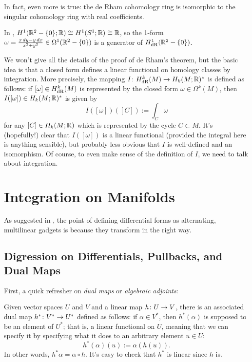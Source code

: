 In fact, even more is true: the de Rham cohomology ring is isomorphic to the singular cohomology ring with real coefficients.

In , $H^1(\mathbb{R}^2 -\{0\};\mathbb{R}) \cong H^1(S^1;\mathbb{R}) \cong \mathbb{R}$, so the 1-form $\omega = \frac{x\, dy - y\, dx}{x^2 + y^2} \in \Omega^1(\mathbb{R}^2 -\{0\})$ is a generator of $H_{\text{dR}}^1(\mathbb{R}^2-\{0\})$.

We won't give all the details of the proof of de Rham's theorem, but the basic idea is that a closed form defines a linear functional on homology classes by integration. More precisely, the mapping $I \colon\thinspace\! H_{\text{dR}}^k(M) \to H_k(M;\mathbb{R})^\ast$ is defined as follows: if $[\omega] \in H_{\text{dR}}^k(M)$ is represented by the closed form $\omega \in \Omega^k(M)$, then $I([\omega]) \in H_k(M;\mathbb{R})^\ast$ is given by
\[
	I([\omega])([C]) := \int_C \omega
\]
for any $[C] \in H_k(M;\mathbb{R})$ which is represented by the cycle $C \subset M$. It's (hopefully!) clear that $I([\omega])$ is a linear functional (provided the integral here is anything sensible), but probably less obvious that $I$ is well-defined and an isomorphism. Of course, to even make sense of the definition of $I$, we need to talk about integration.

\section{Integration on Manifolds}
\label{sec:integration_on_manifolds}

As suggested in , the point of defining differential forms as alternating, multilinear gadgets is because they transform in the right way. 

\subsection{Digression on Differentials, Pullbacks, and Dual Maps} 
\label{sub:digression_on_differentials_pullbacks_and_dual_maps}

First, a quick refresher on \emph{dual maps} or \emph{algebraic adjoints}:

Given vector spaces $U$ and $V$ and a linear map $h \colon\thinspace\! U \to V$, there is an associated dual map $h^\ast \colon\thinspace\! V^\ast \to U^\ast$ defined as follows: if $\alpha \in V^\ast$, then $h^\ast(\alpha)$ is supposed to be an element of $U^\ast$; that is, a linear functional on $U$, meaning that we can specify it by specifying what it does to an arbitrary element $u \in U$:
\[
	h^\ast(\alpha)(u) := \alpha(h(u)).
\]
In other words, $h^\ast \alpha = \alpha \circ h$. It's easy to check that $h^\ast$ is linear since $h$ is.

